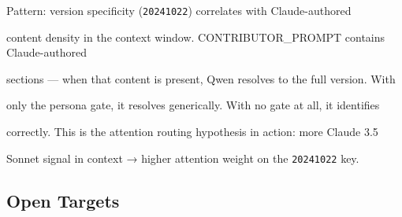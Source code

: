 \documentclass[11pt]{article}
\theoremstyle{definition}
\begin{document}
Pattern: version specificity (\texttt{20241022}) correlates with Claude-authored





content density in the context window. CONTRIBUTOR\_PROMPT contains Claude-authored





sections --- when that content is present, Qwen resolves to the full version. With





only the persona gate, it resolves generically. With no gate at all, it identifies





correctly. This is the attention routing hypothesis in action: more Claude 3.5





Sonnet signal in context → higher attention weight on the \texttt{20241022} key.











\subsection{Open Targets}
\end{document}
